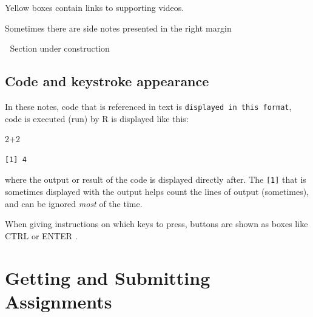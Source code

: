 \documentclass[
  letterpaper,
  DIV=11,
  numbers=noendperiod,
  oneside]{scrreprt}
\newenvironment{Shaded}{\begin{snugshade}}{\end{snugshade}}
\newcommand{\DecValTok}[1]{\textcolor[rgb]{0.68,0.00,0.00}{#1}}
\newcommand{\SpecialCharTok}[1]{\textcolor[rgb]{0.37,0.37,0.37}{#1}}
\begin{document}
\begin{tcolorbox}[enhanced jigsaw, bottomrule=.15mm, colback=white, colframe=quarto-callout-caution-color-frame, toprule=.15mm, coltitle=black, rightrule=.15mm, opacitybacktitle=0.6, colbacktitle=quarto-callout-caution-color!10!white, toptitle=1mm, leftrule=.75mm, breakable, bottomtitle=1mm, titlerule=0mm, title=\textcolor{quarto-callout-caution-color}{\faFire}\hspace{0.5em}{Follow along videos}, arc=.35mm, left=2mm, opacityback=0]

Yellow boxes contain links to supporting videos.

\end{tcolorbox}

Sometimes there are side notes presented in the right margin
{}

🚧 Section under construction

\subsection*{Code and keystroke
appearance}\label{code-and-keystroke-appearance}

In these notes, code that is referenced in text is
\texttt{displayed\ in\ this\ format}, code is executed (run) by R is
displayed like this:

\begin{Shaded}
\begin{Highlighting}[]
\DecValTok{2}\SpecialCharTok{+}\DecValTok{2}
\end{Highlighting}
\end{Shaded}

\begin{verbatim}
[1] 4
\end{verbatim}

where the output or result of the code is displayed directly after. The
\texttt{{[}1{]}} that is sometimes displayed with the output helps count
the lines of output (sometimes), and can be ignored \emph{most} of the
time.

When giving instructions on which keys to press, buttons are shown as
boxes like CTRL or ENTER .

\section*{Getting and Submitting
Assignments}\label{getting-and-submitting-assignments}
\end{document}
